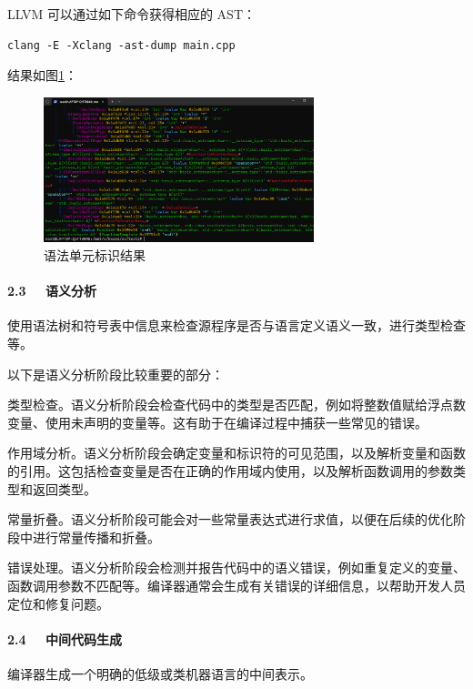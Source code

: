 \documentclass[UTF8,a4paper,10pt]{ctexart}
\begin{document}
LLVM 可以通过如下命令获得相应的 AST：
\begin{lstlisting}[frame=trbl]
  clang -E -Xclang -ast-dump main.cpp
\end{lstlisting}\par
结果如图\ref{fig:4}：
\begin{figure}[H]
    \centering
    \includegraphics[width=0.7\textwidth,height=0.7\textwidth]{imgs/语法.png}
    \caption{语法单元标识结果}
    \label{fig:4}
\end{figure}

\paragraph{2.3 \ \ 语义分析}
使用语法树和符号表中信息来检查源程序是否与语言定义语义一致，进行类型检查等。

以下是语义分析阶段比较重要的部分：


类型检查。语义分析阶段会检查代码中的类型是否匹配，例如将整数值赋给浮点数变量、使用未声明的变量等。这有助于在编译过程中捕获一些常见的错误。


作用域分析。语义分析阶段会确定变量和标识符的可见范围，以及解析变量和函数的引用。这包括检查变量是否在正确的作用域内使用，以及解析函数调用的参数类型和返回类型。


常量折叠。语义分析阶段可能会对一些常量表达式进行求值，以便在后续的优化阶段中进行常量传播和折叠。


错误处理。语义分析阶段会检测并报告代码中的语义错误，例如重复定义的变量、函数调用参数不匹配等。编译器通常会生成有关错误的详细信息，以帮助开发人员定位和修复问题。


\paragraph{2.4 \ \ 中间代码生成}
编译器生成一个明确的低级或类机器语言的中间表示。
\end{document}

